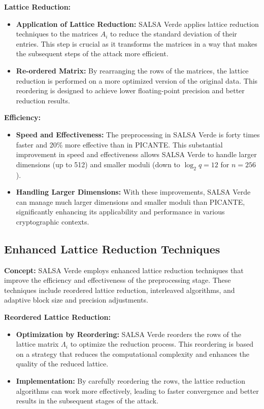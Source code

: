\documentclass{article}
\begin{document}
\textbf{Lattice Reduction:}

\begin{itemize}
    \item \textbf{Application of Lattice Reduction:} SALSA Verde applies lattice reduction techniques to the matrices \( A_i \) to reduce the standard deviation of their entries. This step is crucial as it transforms the matrices in a way that makes the subsequent steps of the attack more efficient.
    \item \textbf{Re-ordered Matrix:} By rearranging the rows of the matrices, the lattice reduction is performed on a more optimized version of the original data. This reordering is designed to achieve lower floating-point precision and better reduction results.
\end{itemize}

\textbf{Efficiency:}

\begin{itemize}
    \item \textbf{Speed and Effectiveness:} The preprocessing in SALSA Verde is forty times faster and 20\% more effective than in PICANTE. This substantial improvement in speed and effectiveness allows SALSA Verde to handle larger dimensions (up to 512) and smaller moduli (down to \( \log_2 q = 12 \) for \( n = 256 \)).
    \item \textbf{Handling Larger Dimensions:} With these improvements, SALSA Verde can manage much larger dimensions and smaller moduli than PICANTE, significantly enhancing its applicability and performance in various cryptographic contexts.
\end{itemize}

\subsection{Enhanced Lattice Reduction Techniques}

\textbf{Concept:} SALSA Verde employs enhanced lattice reduction techniques that improve the efficiency and effectiveness of the preprocessing stage. These techniques include reordered lattice reduction, interleaved algorithms, and adaptive block size and precision adjustments.

\vspace{3mm}

\textbf{Reordered Lattice Reduction:}

\begin{itemize}
    \item \textbf{Optimization by Reordering:} SALSA Verde reorders the rows of the lattice matrix \( \Lambda_i \) to optimize the reduction process. This reordering is based on a strategy that reduces the computational complexity and enhances the quality of the reduced lattice.
    \item \textbf{Implementation:} By carefully reordering the rows, the lattice reduction algorithms can work more effectively, leading to faster convergence and better results in the subsequent stages of the attack.
\end{itemize}
\end{document}
